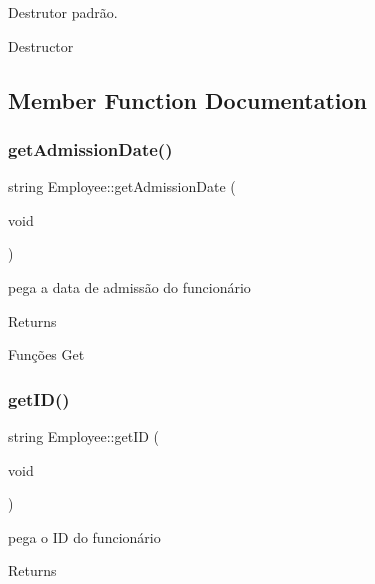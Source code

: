 Destrutor padrão. 

Destructor 

\subsection{Member Function Documentation}
\mbox{\label{classEmployee_a4c5366486364f7c2d932bcb50b3f2cda}} 
\subsubsection{\texorpdfstring{get\+Admission\+Date()}{getAdmissionDate()}}
{\footnotesize\ttfamily string Employee\+::get\+Admission\+Date (\begin{DoxyParamCaption}\item[{void}]{ }\end{DoxyParamCaption})}



pega a data de admissão do funcionário 

\begin{DoxyReturn}{Returns}

\end{DoxyReturn}
Funções Get \mbox{\label{classEmployee_a7b06dc8ef948b2b57f742b0f5d481c50}} 
\subsubsection{\texorpdfstring{get\+I\+D()}{getID()}}
{\footnotesize\ttfamily string Employee\+::get\+ID (\begin{DoxyParamCaption}\item[{void}]{ }\end{DoxyParamCaption})}



pega o ID do funcionário 

\begin{DoxyReturn}{Returns}

\end{DoxyReturn}
\mbox{\label{classEmployee_a6d9a4c9774bf7953142f07ab13f4e297}} 
